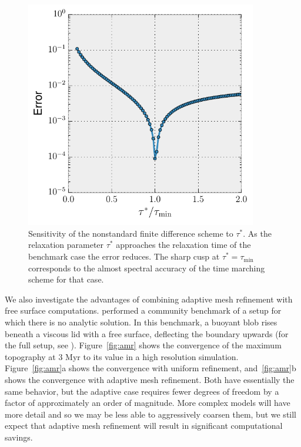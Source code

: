 \documentclass[preprint,12pt,authoryear]{elsarticle}
\begin{document}
\begin{figure}
\includegraphics[width=0.9\textwidth]{figures/tau_sensitivity.pdf}
\caption{Sensitivity of the nonstandard finite difference scheme to $\tau^*$. As the relaxation parameter $\tau^*$ approaches the relaxation time of the benchmark case the error reduces. The sharp cusp at $\tau^* = \tau_\mathrm{min}$ corresponds to the almost spectral accuracy of the time marching scheme for that case.}
\label{fig:tau_sensitivity}
\end{figure}

We also investigate the advantages of combining adaptive mesh refinement with free surface computations.
\citet{crameri2012comparison} performed a community benchmark of a setup for which there is no analytic
solution. In this benchmark, a buoyant blob rises beneath a viscous lid with a free surface, deflecting the
boundary upwards (for the full setup, see \citet{crameri2012comparison}). 
Figure~\ref{fig:amr} shows the convergence of the maximum topography at 3 Myr to its value in a high resolution simulation.
Figure~\ref{fig:amr}a shows the convergence with uniform refinement, and~\ref{fig:amr}b shows the convergence
with adaptive mesh refinement. Both have essentially the same behavior, but the adaptive case requires 
fewer degrees of freedom by a factor of approximately an order of magnitude. More complex models will have
more detail and so we may be less able to aggressively coarsen them, but we still expect that adaptive mesh refinement 
will result in significant computational savings.
\end{document}
